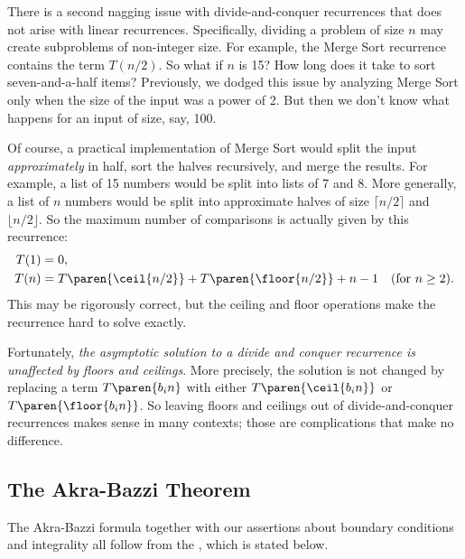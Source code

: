 There is a second nagging issue with divide-and-conquer recurrences
that does not arise with linear recurrences.  Specifically, dividing
a problem of size $n$ may create subproblems of non-integer size.  For
example, the Merge Sort recurrence contains the term $T(n/2)$.  So
what if $n$ is 15?  How long does it take to sort seven-and-a-half
items?  Previously, we dodged this issue by analyzing Merge Sort only
when the size of the input was a power of 2.  But then we don't know
what happens for an input of size, say, 100.

Of course, a practical implementation of Merge Sort would split the
input \emph{approximately} in half, sort the halves recursively, and
merge the results.  For example, a list of 15 numbers would be split
into lists of 7 and 8.  More generally, a list of $n$ numbers would be
split into approximate halves of size $\lceil n / 2 \rceil$ and
$\lfloor n / 2 \rfloor$.  So the maximum number of comparisons is
actually given by this recurrence:
\begin{align*}
T(1) & = 0, \\
T(n) & = T\paren{\ceil{n/2}} + T\paren{\floor{n/2}}+ n - 1 & \text{(for $n \geq 2$).}
\end{align*}
This may be rigorously correct, but the ceiling and floor operations
make the recurrence hard to solve exactly.

Fortunately, \emph{the asymptotic solution to a divide and conquer
  recurrence is unaffected by floors and ceilings}.  More precisely,
the solution is not changed by replacing a term $T\paren{b_i n}$ with
either $T\paren{\ceil{b_i n}}$ or $T\paren{\floor{b_i n}}$.  So
leaving floors and ceilings out of divide-and-conquer recurrences
makes sense in many contexts; those are complications that make no
difference.

\subsection{The Akra-Bazzi Theorem}

The Akra-Bazzi formula together with our assertions about boundary
conditions and integrality all follow from the , which is stated below.

